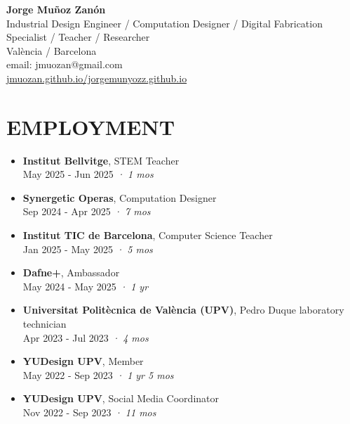 \documentclass[11pt,a4paper]{article}
\begin{document}
\begin{center}
\textbf{\Large Jorge Muñoz Zanón}\\
\vspace{0.1cm}
Industrial Design Engineer / Computation Designer / Digital Fabrication Specialist / Teacher / Researcher\\
València / Barcelona\\
email: jmuozan@gmail.com\\
\href{https://jmuozan.github.io/jorgemunyozz.github.io/}{jmuozan.github.io/jorgemunyozz.github.io}
\end{center}


\section*{EMPLOYMENT}
\begin{itemize}[leftmargin=*,label={},itemsep=6pt]
    \item \textbf{Institut Bellvitge}, STEM Teacher\\
    May 2025 - Jun 2025 \textit{· 1 mos}

    \item \textbf{Synergetic Operas}, Computation Designer\\
    Sep 2024 - Apr 2025 \textit{· 7 mos}
    
    \item \textbf{Institut TIC de Barcelona}, Computer Science Teacher\\
    Jan 2025 - May 2025 \textit{· 5 mos}
    
    \item \textbf{Dafne+}, Ambassador\\
    May 2024 - May 2025 \textit{· 1 yr}
    
    \item \textbf{Universitat Politècnica de València (UPV)}, Pedro Duque laboratory technician\\
    Apr 2023 - Jul 2023 \textit{· 4 mos}
    
    \item \textbf{YUDesign UPV}, Member\\
    May 2022 - Sep 2023 \textit{· 1 yr 5 mos}
    
    \item \textbf{YUDesign UPV}, Social Media Coordinator\\
    Nov 2022 - Sep 2023 \textit{· 11 mos}
\end{itemize}
\end{document}
